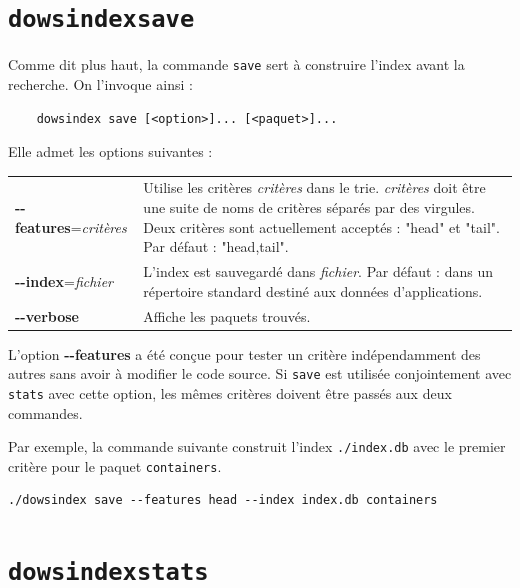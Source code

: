 \documentclass[a4paper]{report}
\theoremstyle{definition}
\newcommand{\dowsindex}{\texttt{dowsindex}\xspace}
\begin{document}
\section{\dowsindex \texttt{save}}

Comme dit plus haut, la commande \texttt{save} sert à construire l'index avant la recherche. On l'invoque ainsi :

\begin{center}
	\begin{verbatim}
	dowsindex save [<option>]... [<paquet>]...
	\end{verbatim}
\end{center}

Elle admet les options suivantes :

\begin{table}[h]
	\begin{tabularx}{\textwidth}{lX}
			\textbf{-{}-features}=\textit{critères} &
			Utilise les critères \textit{critères} dans le trie. \textit{critères} doit être une suite de noms de critères séparés par des virgules. Deux critères sont actuellement acceptés : "head" et "tail". Par défaut : "head,tail".
		\\
			\textbf{-{}-index}=\textit{fichier} &
			L'index est sauvegardé dans \textit{fichier}. Par défaut : dans un répertoire standard destiné aux données d'applications.
		\\
			\textbf{-{}-verbose} &
			Affiche les paquets trouvés.
	\end{tabularx}
\end{table}

L'option \textbf{-{}-features} a été conçue pour tester un critère indépendamment des autres sans avoir à modifier le code source. Si \texttt{save} est utilisée conjointement avec \texttt{stats} avec cette option, les mêmes critères doivent être passés aux deux commandes.

Par exemple, la commande suivante construit l'index \texttt{./index.db} avec le premier critère pour le paquet \texttt{containers}.

\begin{verbatim}
./dowsindex save --features head --index index.db containers
\end{verbatim}


\section{\dowsindex \texttt{stats}}
\end{document}
